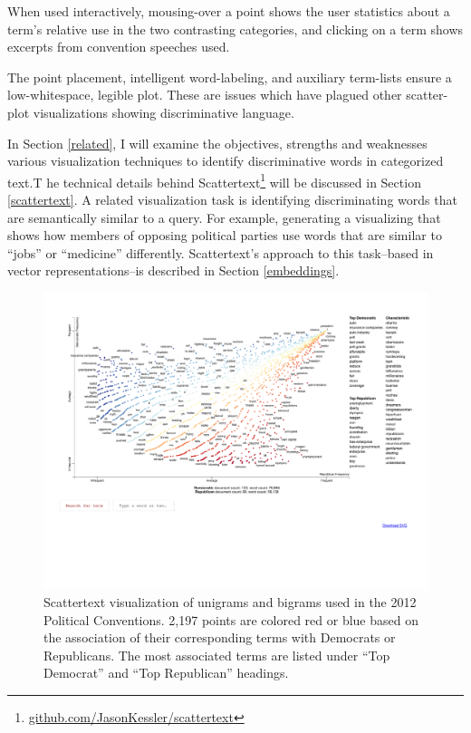 \documentclass[11pt,a4paper]{article}
\begin{document}
When used interactively, mousing-over a point shows the user statistics about a term's relative use in the two contrasting categories, and clicking on a term shows excerpts from convention speeches used.  

The point placement, intelligent word-labeling, and auxiliary term-lists ensure a low-whitespace, legible plot.  These are issues which have plagued other scatter-plot visualizations showing discriminative language.

In Section \ref{related}, I will examine the objectives, strengths and weaknesses various visualization techniques to identify discriminative words in categorized text.T he technical details behind Scattertext\footnote{\href{http://www.github.com/JasonKessler/scattertext}{github.com/JasonKessler/scattertext}} will be discussed in Section \ref{scattertext}. A related visualization task is identifying discriminating words that are semantically similar to a query.  For example, generating a visualizing that shows how members of opposing political parties use words that are similar to ``jobs'' or ``medicine'' differently. Scattertext's approach to this task--based in vector representations--is described in Section \ref{embeddings}.
\begin{figure}[h!!]
  \includegraphics[width=\linewidth,scale=0.8]{primary_scattertext}
  \caption{Scattertext visualization of unigrams and bigrams used in the 2012 Political Conventions. 2,197 points are colored red or blue based on the association of their corresponding terms with Democrats or Republicans.  The most associated terms are listed under ``Top Democrat'' and ``Top Republican'' headings.}
\label{scattertextmain}
\vspace{-0.5cm}
\end{figure}
\end{document}
